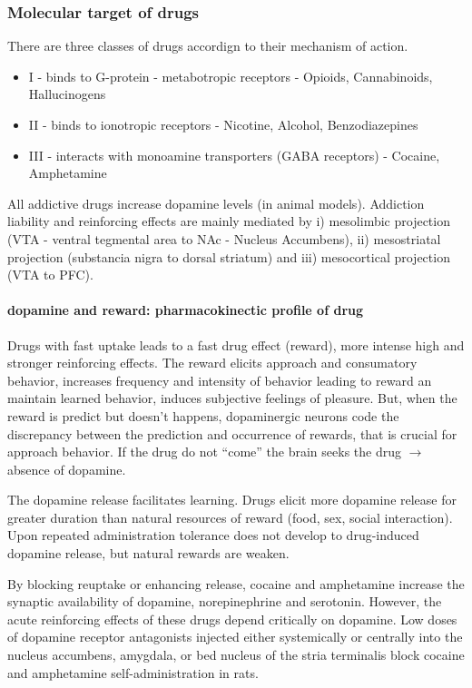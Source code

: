 \documentclass[12pt,article,oneside,a4paper]{memoir}
\begin{document}
\subsubsection{Molecular target of drugs}
There are three classes of drugs accordign to their mechanism of action.

\begin{itemize}
\item I - binds to G-protein - metabotropic receptors - Opioids, Cannabinoids, Hallucinogens
\item II - binds to ionotropic receptors - Nicotine, Alcohol, Benzodiazepines
\item III - interacts with monoamine transporters (GABA receptors) - Cocaine, Amphetamine
\end{itemize}

All addictive drugs increase dopamine levels (in animal models). Addiction liability and reinforcing effects are mainly mediated by i) mesolimbic projection (VTA - ventral tegmental area to NAc - Nucleus Accumbens), ii) mesostriatal projection (substancia nigra to dorsal striatum) and iii) mesocortical projection (VTA to PFC).

\paragraph{dopamine and reward: pharmacokinectic profile of drug}
Drugs with fast uptake leads to a fast drug effect (reward), more intense high and stronger reinforcing effects.
The reward elicits approach and consumatory behavior, increases frequency and intensity of behavior leading to reward an maintain learned behavior, induces subjective feelings of pleasure. But, when the reward is predict but doesn't happens, dopaminergic neurons code the discrepancy between the prediction and occurrence of rewards, that is crucial for approach behavior. If the drug do not ``come'' the brain seeks the drug $\rightarrow$ absence of dopamine.

The dopamine release facilitates learning. Drugs elicit more dopamine release for greater duration than natural resources of reward (food, sex, social interaction). Upon repeated administration tolerance does not develop to drug-induced dopamine release, but natural rewards are weaken.

By blocking reuptake or enhancing release, cocaine and amphetamine increase the synaptic availability of dopamine, norepinephrine and serotonin. However, the acute reinforcing effects of these drugs depend critically on dopamine. Low doses of dopamine receptor antagonists injected either systemically or centrally into the nucleus accumbens, amygdala, or bed nucleus of the stria terminalis block cocaine and amphetamine self-administration in rats.
\end{document}
